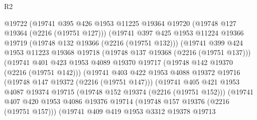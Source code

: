 \begin{lexlean}{R2}
\begin{coremodule}
                      @19722
                      (@19741
                        @395
                        @426
                        @1953
                        @11225
                        @19364
                        @19720
                        (@19748 @127 @19364 (@2216 (@19751 @127)))
                        (@19741
                          @397
                          @425
                          @1953
                          @11224
                          @19366
                          @19719
                          (@19748 @132 @19366 (@2216 (@19751 @132)))
                          (@19741
                            @399
                            @424
                            @1953
                            @11223
                            @19368
                            @19718
                            (@19748 @137 @19368 (@2216 (@19751 @137)))
                            (@19741
                              @401
                              @423
                              @1953
                              @4089
                              @19370
                              @19717
                              (@19748 @142 @19370 (@2216 (@19751 @142)))
                              (@19741
                                @403
                                @422
                                @1953
                                @4088
                                @19372
                                @19716
                                (@19748 @147 @19372 (@2216 (@19751 @147)))
                                (@19741
                                  @405
                                  @421
                                  @1953
                                  @4087
                                  @19374
                                  @19715
                                  (@19748 @152 @19374 (@2216 (@19751 @152)))
                                  (@19741
                                    @407
                                    @420
                                    @1953
                                    @4086
                                    @19376
                                    @19714
                                    (@19748 @157 @19376 (@2216 (@19751 @157)))
                                    (@19741
                                      @409
                                      @419
                                      @1953
                                      @3312
                                      @19378
                                      @19713

\end{coremodule}
\end{lexlean}
